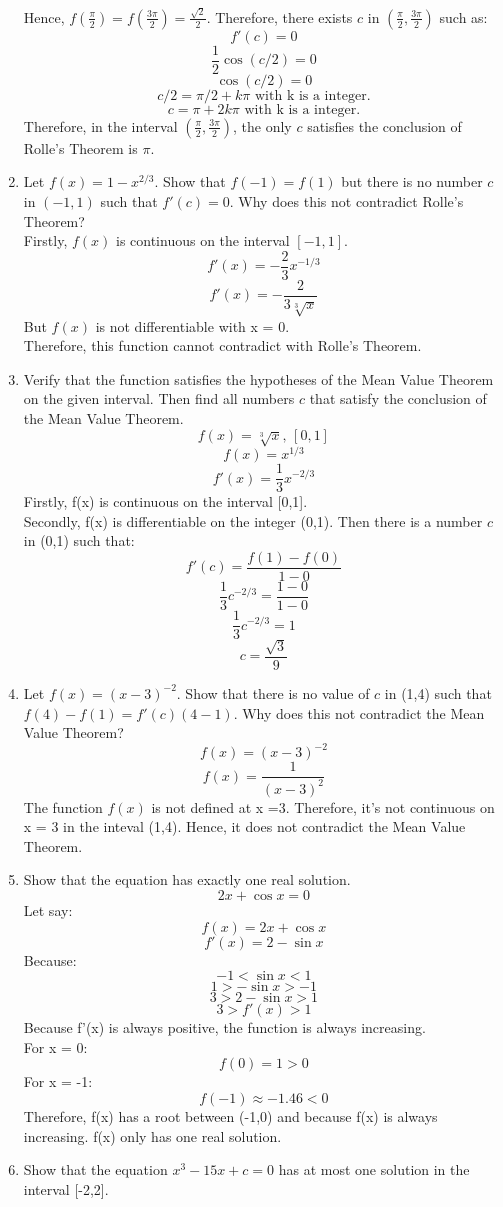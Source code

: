 \documentclass[12pt]{article}
\begin{document}
\begin{enumerate}
    Hence, $f(\frac{\pi}{2}) = f(\frac{3\pi}{2}) = \frac{\sqrt{2}}{2}$. Therefore, there exists $c$ in $(\frac{\pi}{2},\frac{3\pi}{2})$ such as:
        \[f'(c) = 0\]
        \[\frac{1}{2} \cos(c/2) = 0\]
        \[\cos(c/2) = 0\]
        \[c/2 = \pi/2 + k\pi \text{ with k is a integer.}\]
        \[c = \pi + 2k\pi \text{ with k is a integer.}\]
        Therefore, in the interval $(\frac{\pi}{2},\frac{3\pi}{2})$, the only $c$ satisfies the conclusion of Rolle’s Theorem is $\pi$.
        \setcounter{enumi}{12}
        \newpage
    \item Let $f(x) = 1 - x^{2/3}$. Show that $f(-1) = f(1)$ but there is no number $c$ in $(-1,1)$ such that $f'(c) = 0$. Why does this not contradict Rolle’s Theorem?\\
    Firstly, $f(x)$ is continuous on the interval $[-1,1]$.    
        \[f'(x) = -\frac{2}{3}x^{-1/3}\]
        \[f'(x) = -\frac{2}{3\sqrt[3]{x}}\]
    But $f(x)$ is not differentiable with x = 0.\\
    Therefore, this function cannot contradict with Rolle’s Theorem.
    \setcounter{enumi}{16}
    \item Verify that the function satisfies the hypotheses of the Mean Value Theorem on the given interval. Then find all numbers $c$ that satisfy the conclusion of the Mean Value Theorem.
        \[f(x) = \sqrt[3]{x}\text{, } [0,1]\] 
        \[f(x) = x^{1/3}\]
        \[f'(x) = \frac{1}{3}x^{-2/3}\]
    Firstly, f(x) is continuous on the interval [0,1].\\
    Secondly, f(x) is differentiable on the integer (0,1).
    Then there is a number $c$ in (0,1) such that:
        \[f'(c) = \frac{f(1) - f(0)}{1-0}\]
        \[\frac{1}{3}c^{-2/3} = \frac{1 - 0}{1 - 0}\]
        \[\frac{1}{3}c^{-2/3} = 1\]
        \[c = \frac{\sqrt{3}}{9}\]
    \setcounter{enumi}{20}
    \item Let $f(x) = (x-3)^{-2}$. Show that there is no value of $c$ in (1,4) such that $f(4) - f(1) = f'(c)(4-1)$. Why does this not contradict the Mean Value Theorem?
        \[f(x) = (x-3)^{-2}\]
        \[f(x) = \frac{1}{(x-3)^{2}}\]
        The function $f(x)$ is not defined at x =3. Therefore, it's not continuous on x = 3 in the inteval (1,4). Hence, it does not contradict the Mean Value Theorem.
    \setcounter{enumi}{22}
    \item Show that the equation has exactly one real solution.
        \[2x + \cos x = 0\]
    Let say:
        \[f(x) = 2x + \cos x\]
        \[f'(x) = 2 - \sin x\]
    Because:
        \[-1 < \sin x < 1\]
        \[1 > -\sin x > -1\]
        \[3 > 2-\sin x > 1\]
        \[3 > f'(x) > 1\]
    Because f'(x) is always positive, the function is always increasing.\\
    For x = 0:
        \[f(0) = 1 > 0\] 
    For x = -1:
        \[f(-1) \approx -1.46 < 0 \] 
    Therefore, f(x) has a root between (-1,0) and because f(x) is always increasing. f(x) only has one real solution.
    \setcounter{enumi}{24}
    \item Show that the equation $x^3 - 15x + c = 0$ has at most one solution in the interval [-2,2].
\end{enumerate}
\end{document}
